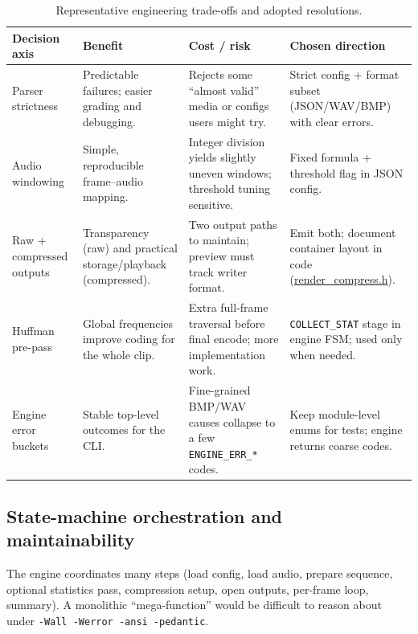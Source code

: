 \begin{table}[htbp]
    \centering
    \small
    \caption{Representative engineering trade-offs and adopted resolutions.}
    \label{tab:tradeoffs}
    \begin{tabularx}{\textwidth}{@{} >{\raggedright\arraybackslash}p{2.6cm} X X X @{}}
        \toprule
        \textbf{Decision axis} & \textbf{Benefit} & \textbf{Cost / risk} & \textbf{Chosen direction} \\
        \midrule
        Parser strictness &
        Predictable failures; easier grading and debugging. &
        Rejects some ``almost valid'' media or configs users might try. &
        Strict config + format subset (JSON/WAV/BMP) with clear errors. \\
        \addlinespace
        Audio windowing &
        Simple, reproducible frame--audio mapping. &
        Integer division yields slightly uneven windows; threshold tuning sensitive. &
        Fixed formula + threshold flag in JSON config. \\
        \addlinespace
        Raw + compressed outputs &
        Transparency (raw) and practical storage/playback (compressed). &
        Two output paths to maintain; preview must track writer format. &
        Emit both; document container layout in code (\url{render_compress.h}). \\
        \addlinespace
        Huffman pre-pass &
        Global frequencies improve coding for the whole clip. &
        Extra full-frame traversal before final encode; more implementation work. &
        \texttt{COLLECT\_STAT} stage in engine FSM; used only when needed. \\
        \addlinespace
        Engine error buckets &
        Stable top-level outcomes for the CLI. &
        Fine-grained BMP/WAV causes collapse to a few \texttt{ENGINE\_ERR\_*} codes. &
        Keep module-level enums for tests; engine returns coarse codes. \\
        \bottomrule
    \end{tabularx}
\end{table}

\subsection{State-machine orchestration and maintainability}
The engine coordinates many steps (load config, load audio, prepare sequence, optional statistics pass, compression setup, open outputs, per-frame loop, summary). A monolithic ``mega-function'' would be difficult to reason about under \texttt{-Wall -Werror -ansi -pedantic}.

